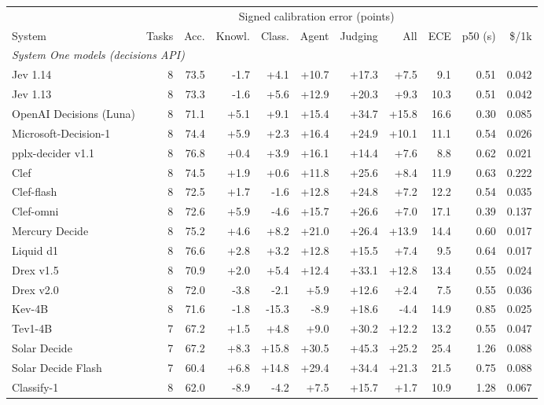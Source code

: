 \begin{table}[t]
\centering
\small
\setlength{\tabcolsep}{4.5pt}
\begin{tabular}{lrrrrrrrrrr}
\toprule
 & & & \multicolumn{5}{c}{Signed calibration error (points)} & & & \\
\cmidrule(lr){4-8}
System & Tasks & Acc. & Knowl. & Class. & Agent & Judging & All & ECE & p50 (s) & \$/1k \\
\midrule
\multicolumn{11}{l}{\textit{System One models (decisions API)}} \\
Jev 1.14 & 8 & 73.5 & -1.7 & +4.1 & +10.7 & +17.3 & +7.5 & 9.1 & 0.51 & 0.042 \\
Jev 1.13 & 8 & 73.3 & -1.6 & +5.6 & +12.9 & +20.3 & +9.3 & 10.3 & 0.51 & 0.042 \\
OpenAI Decisions (Luna) & 8 & 71.1 & +5.1 & +9.1 & +15.4 & +34.7 & +15.8 & 16.6 & 0.30 & 0.085 \\
Microsoft-Decision-1 & 8 & 74.4 & +5.9 & +2.3 & +16.4 & +24.9 & +10.1 & 11.1 & 0.54 & 0.026 \\
pplx-decider v1.1 & 8 & 76.8 & +0.4 & +3.9 & +16.1 & +14.4 & +7.6 & 8.8 & 0.62 & 0.021 \\
Clef & 8 & 74.5 & +1.9 & +0.6 & +11.8 & +25.6 & +8.4 & 11.9 & 0.63 & 0.222 \\
Clef-flash & 8 & 72.5 & +1.7 & -1.6 & +12.8 & +24.8 & +7.2 & 12.2 & 0.54 & 0.035 \\
Clef-omni & 8 & 72.6 & +5.9 & -4.6 & +15.7 & +26.6 & +7.0 & 17.1 & 0.39 & 0.137 \\
Mercury Decide & 8 & 75.2 & +4.6 & +8.2 & +21.0 & +26.4 & +13.9 & 14.4 & 0.60 & 0.017 \\
Liquid d1 & 8 & 76.6 & +2.8 & +3.2 & +12.8 & +15.5 & +7.4 & 9.5 & 0.64 & 0.017 \\
Drex v1.5 & 8 & 70.9 & +2.0 & +5.4 & +12.4 & +33.1 & +12.8 & 13.4 & 0.55 & 0.024 \\
Drex v2.0 & 8 & 72.0 & -3.8 & -2.1 & +5.9 & +12.6 & +2.4 & 7.5 & 0.55 & 0.036 \\
Kev-4B & 8 & 71.6 & -1.8 & -15.3 & -8.9 & +18.6 & -4.4 & 14.9 & 0.85 & 0.025 \\
Tev1-4B & 7 & 67.2 & +1.5 & +4.8 & +9.0 & +30.2 & +12.2 & 13.2 & 0.55 & 0.047 \\
Solar Decide & 7 & 67.2 & +8.3 & +15.8 & +30.5 & +45.3 & +25.2 & 25.4 & 1.26 & 0.088 \\
Solar Decide Flash & 7 & 60.4 & +6.8 & +14.8 & +29.4 & +34.4 & +21.3 & 21.5 & 0.75 & 0.088 \\
Classify-1 & 8 & 62.0 & -8.9 & -4.2 & +7.5 & +15.7 & +1.7 & 10.9 & 1.28 & 0.067 \\

\end{tabular}
\end{table}
